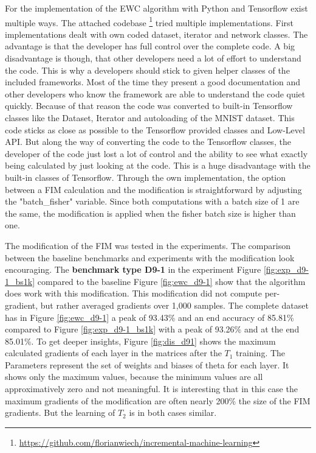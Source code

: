 For the implementation of the EWC algorithm with Python and Tensorflow exist multiple ways.
The attached codebase \footnote{\url{https://github.com/florianwiech/incremental-machine-learning}} tried multiple implementations.
First implementations dealt with own coded dataset, iterator and network classes.
The advantage is that the developer has full control over the complete code.
A big disadvantage is though, that other developers need a lot of effort to understand the code.
This is why a developers should stick to given helper classes of the included frameworks.
Most of the time they present a good documentation and other developers who know the framework are able to understand the code quiet quickly.
Because of that reason the code was converted to built-in Tensorflow classes like the Dataset, Iterator and autoloading of the MNIST dataset.
This code sticks as close as possible to the Tensorflow provided classes and Low-Level API.
But along the way of converting the code to the Tensorflow classes, the developer of the code just lost a lot of control and the ability to see what exactly being calculated by just looking at the code.
This is a huge disadvantage with the built-in classes of Tensorflow.
\newline
Through the own implementation, the option between a FIM calculation and the modification is straightforward by adjusting the "batch\_fisher" variable.
Since both computations with a batch size of 1 are the same, the modification is applied when the fisher batch size is higher than one.

The modification of the FIM was tested in the experiments.
The comparison between the baseline benchmarks and experiments with the modification look encouraging.
\newline
The \textbf{benchmark type D9-1} in the experiment Figure \ref{fig:exp_d9-1_bs1k} compared to the baseline Figure \ref{fig:ewc_d9-1} show that the algorithm does work with this modification.
This modification did not compute per-gradient, but rather averaged gradients over 1,000 samples.
The complete dataset has in Figure \ref{fig:ewc_d9-1} a peak of 93.43\% and an end accuracy of 85.81\% compared to Figure \ref{fig:exp_d9-1_bs1k} with a peak of 93.26\% and at the end 85.01\%.
\newline
To get deeper insights, Figure \ref{fig:dis_d91} shows the maximum calculated gradients of each layer in the matrices after the $T_1$ training.
The Parameters represent the set of weights and biases of theta for each layer.
It shows only the maximum values, because the minimum values are all approximatively zero and not  meaningful.
It is interesting that in this case the maximum gradients of the modification are often nearly 200\% the size of the FIM gradients.
But the learning of $T_2$ is in both cases similar.

